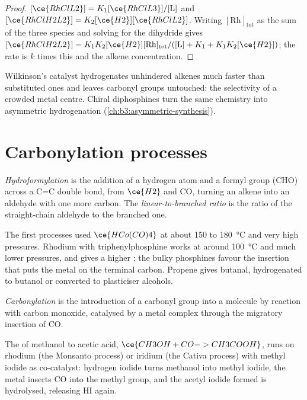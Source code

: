 \begin{proof}
$[\ce{RhClL2}] = K_1[\ce{RhClL3}]/[\mathrm L]$ and $[\ce{RhClH2L2}] = K_2[\ce{H2}][\ce{RhClL2}]$. Writing $[\mathrm{Rh}]_{\mathrm{tot}}$ as the
sum of the three species and solving for the dihydride gives $[\ce{RhClH2L2}] =
K_1K_2[\ce{H2}][\mathrm{Rh}]_{\mathrm{tot}}/([\mathrm L] + K_1 + K_1K_2[\ce{H2}])$; the rate is $k$ times this and the alkene
concentration.
\end{proof}

Wilkinson's catalyst hydrogenates unhindered alkenes much faster than
substituted ones and leaves carbonyl groups untouched: the selectivity of a
crowded metal centre. Chiral diphosphines turn the same chemistry into
asymmetric hydrogenation (\cref{ch:b3:asymmetric-synthesis}).

\section{Carbonylation processes}

\begin{definition}[Hydroformylation]\label{def:b3:homogeneous-catalysis:hydroformylation}
\emph{Hydroformylation} is the addition of a hydrogen atom
and a formyl group (CHO) across a C=C double bond, from $\ce{H2}$ and CO, turning an
alkene into an aldehyde with one more carbon. The \emph{linear-to-branched
ratio} is the ratio of the straight-chain
aldehyde to the branched one.
\end{definition}

The first processes used $\ce{HCo(CO)4}$ at about 150 to \qty{180}{\celsius} and very high
pressures. Rhodium with triphenylphosphine works at around \qty{100}{\celsius} and
much lower pressures, and gives a higher : the bulky
phosphines favour the insertion that puts the metal on the terminal carbon.
Propene gives butanal, hydrogenated to butanol or converted to plasticiser
alcohols.

\begin{definition}[Carbonylation]\label{def:b3:homogeneous-catalysis:carbonylation}
\emph{Carbonylation} is the introduction of a carbonyl group
into a molecule by reaction with carbon monoxide, catalysed by a metal complex
through the migratory insertion of CO.
\end{definition}

The  of methanol to acetic acid, $\ce{CH3OH + CO -> CH3COOH}$, runs on
rhodium (the Monsanto process) or iridium (the Cativa process) with methyl iodide
as co-catalyst: hydrogen iodide turns methanol into methyl iodide, the metal
inserts CO into the methyl group, and the acetyl iodide formed is hydrolysed,
releasing HI again.

